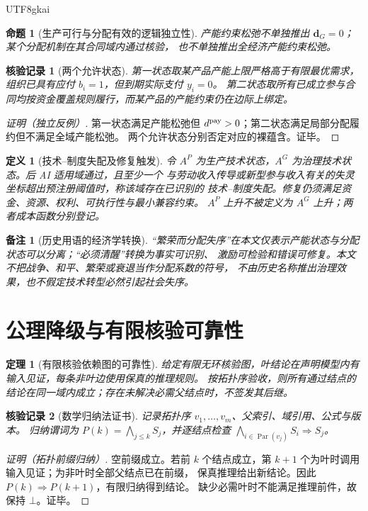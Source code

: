 \documentclass[12pt,a4paper,openany]{report}
\newtheorem{definition}{定义}[chapter]
\newtheorem{theorem}{定理}[chapter]
\newtheorem{proposition}{命题}[chapter]
\newtheorem{remark}{备注}[chapter]
\newtheorem{Certificate}{核验记录}[chapter]
\begin{document}
\begin{CJK*}{UTF8}{gkai}
\begin{proposition}[生产可行与分配有效的逻辑独立性]
\label{prop:independence}
产能约束松弛不单独推出 $\mathbf d_G=0$；某个分配机制在其合同域内通过核验，
也不单独推出全经济产能约束松弛。
\end{proposition}
\begin{Certificate}[两个允许状态]
第一状态取某产品产能上限严格高于有限最优需求，组织已具有应付 $b_i=1$，但到期实际支付 $y_i=0$。
第二状态取所有已成立参与合同均按资金覆盖规则履行，而某产品的产能约束仍在边际上绑定。
\end{Certificate}
\begin{proof}[证明（独立反例）]
第一状态满足产能松弛但 $d^{\rm pay}>0$；第二状态满足局部分配履约但不满足全域产能松弛。
两个允许状态分别否定对应的裸蕴含。证毕。
\end{proof}

\begin{definition}[技术--制度失配及修复触发]
\label{def:mismatch}
令 $A^P$ 为生产技术状态，$A^G$ 为治理技术状态。后 AI 适用域通过，且至少一个
与劳动收入传导或新型参与收入有关的失灵坐标超出预注册阈值时，称该域存在已识别的
技术--制度失配。修复仍须满足资金、资源、权利、可执行性与最小兼容约束。
$A^P$ 上升不被定义为 $A^G$ 上升；两者成本函数分别登记。
\end{definition}

\begin{remark}[历史用语的经济学转换]
“繁荣而分配失序”在本文仅表示产能状态与分配状态可以分离；“必须清醒”转换为事实可识别、
激励可检验和错误可修复。本文不把战争、和平、繁荣或衰退当作分配系数的符号，
不由历史名称推出治理效果，也不假定技术转型必然引起社会失序。
\end{remark}

\section{公理降级与有限核验可靠性}

\begin{theorem}[有限核验依赖图的可靠性]
\label{thm:certificate-induction}
给定有限无环核验图，叶结论在声明模型内有输入见证，每条非叶边使用保真的推理规则。
按拓扑序验收，则所有通过结点的结论在同一域内成立；存在未解决必需父结点时，不签发其后继。
\end{theorem}
\begin{Certificate}[数学归纳法证书]
记录拓扑序 $v_1,\ldots,v_m$、父索引、域引用、公式与版本。
归纳谓词为 $P(k)=\bigwedge_{j\le k}S_j$，并逐结点检查
$\bigwedge_{i\in\operatorname{Par}(v_j)}S_i\Rightarrow S_j$。
\end{Certificate}
\begin{proof}[证明（拓扑前缀归纳）]
空前缀成立。若前 $k$ 个结点成立，第 $k+1$ 个为叶时调用输入见证；为非叶时全部父结点已在前缀，
保真推理给出新结论。因此 $P(k)\Rightarrow P(k+1)$，有限归纳得到结论。
缺少必需叶时不能满足推理前件，故保持 $\bot$。证毕。
\end{proof}


\end{CJK*}
\end{document}

